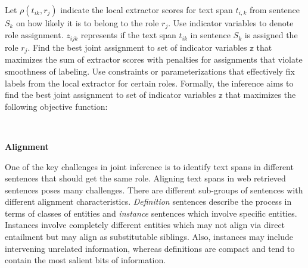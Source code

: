 Let $\rho(t_{ik}, r_j)$ indicate the local extractor scores for text span $t_{i,k}$ from sentence $S_k$ on how likely it is to belong to the role $r_j$. Use indicator variables to denote role assignment. $z_{ijk}$ represents if the text span $t_{ik}$ in sentence $S_k$ is assigned the role $r_j$. 
Find the best joint assignment to set of indicator variables $\mathbb{z}$ that maximizes the sum of extractor scores with penalties for assignments that violate smoothness of labeling.
Use constraints or parameterizations that effectively fix labels from the local extractor for certain roles. 
Formally, the inference aims to find the best joint assignment to set of indicator variables $\mathbb{z}$ that maximizes the following objective function:

\begin{center}
\\

\end{center}


{\bf Alignment}

One of the key challenges in joint inference is to identify text spans in different sentences that should get the same role. 
Aligning text spans in web retrieved sentences poses many challenges. 
There are different sub-groups of sentences with different alignment characteristics. 
{\em Definition} sentences describe the process in terms of classes of entities and {\em instance} sentences which involve specific entities.
Instances involve completely different entities which may not align via direct entailment but may align as substitutable siblings.
Also, instances may include intervening unrelated information, whereas definitions are compact and tend to contain the most salient bits of information. 

